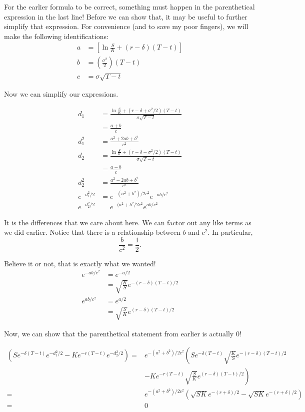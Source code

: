 \documentclass{ximera}
\begin{document}
For the earlier formula to be correct, something must happen in the parenthetical expression in the last line! Before we can show that, it may be useful to further simplify that expression. For convenience (and to save my poor fingers), we will make the following identifications:
\begin{align*}
a 	&=\left[\ln\frac{S}{K}+(r-\delta)(T-t)\right]\\
b 	&=\left(\frac{\sigma^2}{2}\right)(T-t)\\
c 	&=\sigma\sqrt{T-t}
\end{align*}

Now we can simplify our expressions.

\begin{align*}
d_1 			&=\frac{\ln\frac{S}{K}+(r-\delta+\sigma^2/2)(T-t)}{\sigma\sqrt{T-t}}\\
			&=\frac{a+b}{c}\\
d_1^2 		&=\frac{a^2+2ab+b^2}{c^2}\\
d_2 			&=\frac{\ln\frac{S}{K}+(r-\delta-\sigma^2/2)(T-t)}{\sigma\sqrt{T-t}}\\
			&=\frac{a-b}{c}\\
d_2^2 		&=\frac{a^2-2ab+b^2}{c^2}\\
e^{-d_1^2/2} 	&=e^{-(a^2+b^2)/2c^2}e^{-ab/c^2}\\
e^{-d_2^2/2}	&=e^{-(a^2+b^2/2c^2}e^{ab/c^2}
\end{align*}

It is the differences that we care about here. We can factor out any like terms as we did earlier. Notice that there is a relationship between $b$ and $c^2$. In particular,
\begin{equation*}
\frac{b}{c^2}=\frac{1}{2}.
\end{equation*}

Believe it or not, that is exactly what we wanted!
\begin{align*}
e^{-ab/c^2} 	&=e^{-a/2}\\
			&=\sqrt{\frac{K}{S}}e^{-(r-\delta)(T-t)/2}\\
e^{ab/c^2}	 	&=e^{a/2}\\
			&=\sqrt{\frac{S}{K}}e^{(r-\delta)(T-t)/2}
\end{align*}

Now, we can show that the parenthetical statement from earlier is actually 0!

\begin{align*}
\left(Se^{-\delta(T-t)}e^{-d_1^2/2}-Ke^{-r(T-t)}e^{-d_2^2/2}\right)	=&e^{-(a^2+b^2)/2c^2}\left(Se^{-\delta(T-t)}\sqrt{\frac{K}{S}}e^{-(r-\delta)(T-t)/2}\right.\\
											&-\left.Ke^{-r(T-t)}\sqrt{\frac{S}{K}}e^{(r-\delta)(T-t)/2}\right)\\
											=&e^{-(a^2+b^2)/2c^2}(\sqrt{SK}e^{-(r+\delta)/2}-\sqrt{SK}e^{-(r+\delta)/2})\\
											=&0
\end{align*}
\end{document}
